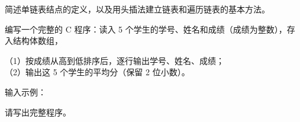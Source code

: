 \documentclass[a4paper,11pt]{article}
\begin{document}
\q 简述单链表结点的定义，以及用头插法建立链表和遍历链表的基本方法。\anslines{3.2cm}

\newpage
{}
\q 编写一个完整的 C 程序：读入 5 个学生的学号、姓名和成绩（成绩为整数），存入结构体数组，
\par\vspace{0.15em}
\noindent（1）按成绩从高到低排序后，逐行输出学号、姓名、成绩；\\
\noindent（2）输出这 5 个学生的平均分（保留 2 位小数）。

\noindent 输入示例：
\par\noindent{}
\par\noindent{}
\par\noindent{}
\par\noindent{}
\par\noindent{}

\noindent 请写出完整程序。\anslines{4.0cm}
\end{document}
